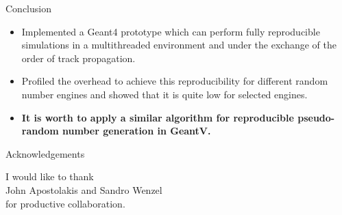 \documentclass[aspectratio=169, 14pt]{beamer}
\begin{document}
\begin{large}
 
 \begin{frame}{Conclusion}
  \begin{itemize}
   \item Implemented a Geant4 prototype which can perform fully reproducible simulations in a multithreaded environment and under the exchange of the order of track propagation.
   \item Profiled the overhead to achieve this reproducibility for different random number engines and showed that it is quite low for selected engines.
  
   \item \bf It is worth to apply a similar algorithm for reproducible pseudo-random number generation in GeantV.
  \end{itemize}

 \end{frame}
 
 \begin{frame}{Acknowledgements}

  \centering
  I would like to thank\\
  John Apostolakis and Sandro Wenzel\\
  for productive collaboration. 

 \end{frame}
 
 
 \appendix
 
 \end{large}
\end{document}
